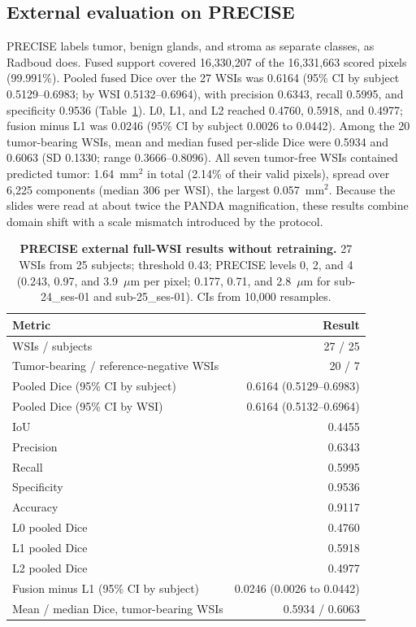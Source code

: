 \documentclass[10pt,letterpaper]{article}
\begin{document}
\subsection*{External evaluation on PRECISE}
PRECISE labels tumor, benign glands, and stroma as separate classes, as Radboud does. Fused support covered 16,330,207 of the 16,331,663 scored pixels (99.991\%). Pooled fused Dice over the 27 WSIs was 0.6164 (95\% CI by subject 0.5129--0.6983; by WSI 0.5132--0.6964), with precision 0.6343, recall 0.5995, and specificity 0.9536 (Table~\ref{tab:precise}). L0, L1, and L2 reached 0.4760, 0.5918, and 0.4977; fusion minus L1 was 0.0246 (95\% CI by subject 0.0026 to 0.0442). Among the 20 tumor-bearing WSIs, mean and median fused per-slide Dice were 0.5934 and 0.6063 (SD 0.1330; range 0.3666--0.8096). All seven tumor-free WSIs contained predicted tumor: 1.64~mm$^2$ in total (2.14\% of their valid pixels), spread over 6,225 components (median 306 per WSI), the largest 0.057~mm$^2$. Because the slides were read at about twice the PANDA magnification, these results combine domain shift with a scale mismatch introduced by the protocol.

\begin{table}[H]\centering
\caption{\textbf{PRECISE external full-WSI results without retraining.} 27 WSIs from 25 subjects; threshold 0.43; PRECISE levels 0, 2, and 4 (0.243, 0.97, and 3.9~$\mu$m per pixel; 0.177, 0.71, and 2.8~$\mu$m for sub-24\_ses-01 and sub-25\_ses-01). CIs from 10,000 resamples.}
\begin{tabular}{lr}\toprule Metric & Result\\\midrule
WSIs / subjects & 27 / 25\\
Tumor-bearing / reference-negative WSIs & 20 / 7\\
Pooled Dice (95\% CI by subject) & 0.6164 (0.5129--0.6983)\\
Pooled Dice (95\% CI by WSI) & 0.6164 (0.5132--0.6964)\\
IoU & 0.4455\\
Precision & 0.6343\\
Recall & 0.5995\\
Specificity & 0.9536\\
Accuracy & 0.9117\\
L0 pooled Dice & 0.4760\\
L1 pooled Dice & 0.5918\\
L2 pooled Dice & 0.4977\\
Fusion minus L1 (95\% CI by subject) & 0.0246 (0.0026 to 0.0442)\\
Mean / median Dice, tumor-bearing WSIs & 0.5934 / 0.6063\\
\bottomrule
\end{tabular}\label{tab:precise}\end{table}
\end{document}
